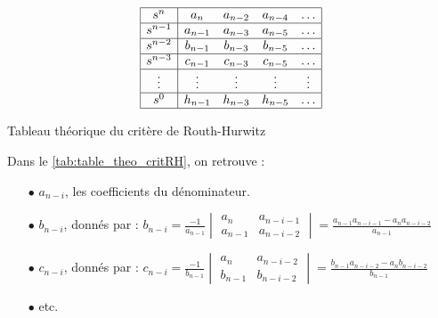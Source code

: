 \documentclass[a4paper,12pt]{article}
\begin{document}
    \begin{table}[H]
        \centering
        \[
        \begin{array}{|c|c c c c|}
            \hline
            s^n & a_n & a_{n-2} & a_{n-4} & \dots \\
            \hline
            s^{n-1} & a_{n-1} & a_{n-3} & a_{n-5} & \dots \\
            \hline
            s^{n-2} & b_{n-1} & b_{n-3} & b_{n-5} & \dots \\
            \hline
            s^{n-3} & c_{n-1} & c_{n-3} & c_{n-5} & \dots \\
            \hline
            \vdots & \vdots & \vdots & \vdots & \vdots \\
            \hline
            s^0 & h_{n-1} & h_{n-3} & h_{n-5} & \dots \\
            \hline
        \end{array}
        \]
        \caption{Tableau théorique du critère de Routh-Hurwitz}
        \label{tab:table_theo_critRH}
    \end{table}
    
    Dans le \autoref{tab:table_theo_critRH}, on retrouve :
    \begin{itemize}
        \item[$\bullet$] $a_{n-i}$, les coefficients du dénominateur.
        \item[$\bullet$] $b_{n-i}$, donnés par :
            $b_{n-i} = \frac{-1}{a_{n-1}}
            \begin{vmatrix}
                a_n & a_{n-i-1} \\
                a_{n-1} & a_{n-i-2}
            \end{vmatrix}
            = \frac{a_{n-1} a_{n-i-1} - a_n a_{n-i-2}}{a_{n-1}}$
        \item[$\bullet$] $c_{n-i}$, donnés par :
            $c_{n-i} = \frac{-1}{b_{n-1}}
            \begin{vmatrix}
                a_n & a_{n-i-2} \\
                b_{n-1} & b_{n-i-2}
            \end{vmatrix}
            = \frac{b_{n-1} a_{n-i-2} - a_n b_{n-i-2}}{b_{n-1}}$
        \item[$\bullet$] etc.
    \end{itemize}
    
\end{document}
